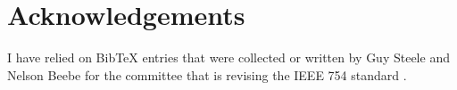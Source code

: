 \documentclass{sigplanconf}
\begin{document}
\section{Acknowledgements}

I have relied on BibTeX entries that were collected or
written by Guy Steele and Nelson Beebe for the committee
that is revising the IEEE 754 standard
\cite{IEEE-754R,Knuth:1990:SPW}.





\onecolumn
\end{document}
